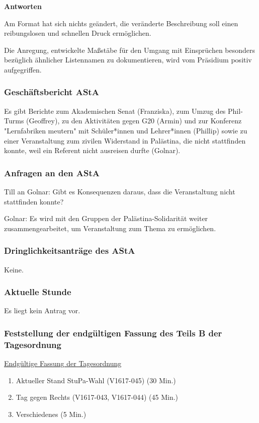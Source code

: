 \documentclass[ngerman,headheight=70pt]{scrartcl}
\begin{document}
    \textbf{Antworten}

    Am Format hat sich nichts geändert, die veränderte Beschreibung soll einen
    reibungslosen und schnellen Druck ermöglichen.

    Die Anregung, entwickelte Maßstäbe für den Umgang mit Einsprüchen besonders
    bezüglich ähnlicher Listennamen zu dokumentieren, wird vom Präsidium positiv
    aufgegriffen.

    \subsubsection{Geschäftsbericht AStA}

    Es gibt Berichte zum Akademischen Senat (Franziska), zum Umzug des Phil-Turms
    (Geoffrey), zu den Aktivitäten gegen G20 (Armin) und zur Konferenz
    "Lernfabriken meutern" mit Schüler*innen und Lehrer*innen (Phillip) sowie
    zu einer Veranstaltung zum zivilen Widerstand in Palästina, die nicht
    stattfinden konnte, weil ein Referent nicht ausreisen durfte (Golnar).

    \subsubsection{Anfragen an den AStA}

    Till an Golnar: Gibt es Konsequenzen daraus, dass die Veranstaltung nicht
    stattfinden konnte?

    Golnar: Es wird mit den Gruppen der Palästina-Solidarität weiter
    zusammengearbeitet, um Veranstaltung zum Thema zu ermöglichen.

    \subsubsection{Dringlichkeitsanträge des AStA}

    Keine.

    \subsubsection{Aktuelle Stunde}

    Es liegt kein Antrag vor.

    \subsubsection{Feststellung der endgültigen Fassung des Teils B der Tagesordnung}

    \underline{Endgültige Fassung der Tagesordnung}
    \begin{enumerate}[label={\textbf{Top \theenumi}},leftmargin=*]
        \item Aktueller Stand StuPa-Wahl (V1617-045) (30 Min.)
        \item Tag gegen Rechts (V1617-043, V1617-044) (45 Min.)
        \item Verschiedenes (5 Min.)
    \end{enumerate}
\end{document}
